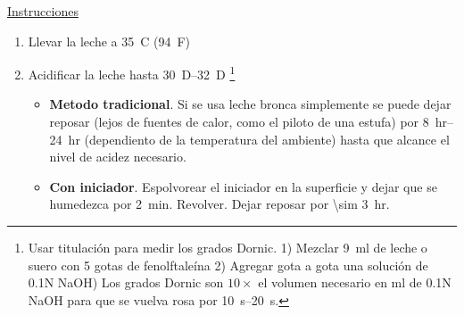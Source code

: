 \underline{Instrucciones}
\begin{enumerate}
\item Llevar la leche a \SI{35}{C} (\SI{94}{F})
\item Acidificar la leche hasta \SIrange{30}{32}{D} \footnote{Usar titulación para medir los grados Dornic. 1) Mezclar \SI{9}{ml} de leche o suero con 5 gotas de fenolftaleína 2) Agregar gota a gota una solución de 0.1N NaOH) Los grados Dornic son $10\times$ el volumen necesario en ml de 0.1N NaOH para que se vuelva rosa por \SIrange{10}{20}{s}.} 
\begin{itemize}
\item \textbf{Metodo tradicional}. Si se usa leche bronca simplemente se puede dejar reposar (lejos de fuentes de calor, como el piloto de una estufa) por \SIrange{8}{24}{hr} (dependiento de la temperatura del ambiente) hasta que alcance el nivel de acidez necesario.
\item \textbf{Con iniciador}. Espolvorear el iniciador en la superficie y dejar que se humedezca por \SI{2}{min}. Revolver. Dejar reposar por \SI{\sim 3}{hr}.
\end{itemize}
\end{enumerate}
